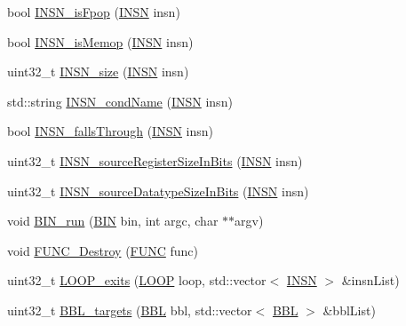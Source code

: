 \begin{DoxyCompactItemize}
\item 
bool \hyperlink{namespace_e_p_a_x_a995404839753a8da4b2fe7d27d9b32d2}{\-I\-N\-S\-N\-\_\-is\-Fpop} (\hyperlink{namespace_e_p_a_x_a601da5f2ead9a877d566da6cfc9026eb}{\-I\-N\-S\-N} insn)
\item 
bool \hyperlink{namespace_e_p_a_x_ad79c932f05a0e9b3a54d6625072ab087}{\-I\-N\-S\-N\-\_\-is\-Memop} (\hyperlink{namespace_e_p_a_x_a601da5f2ead9a877d566da6cfc9026eb}{\-I\-N\-S\-N} insn)
\item 
uint32\-\_\-t \hyperlink{namespace_e_p_a_x_ac633c15baaafa3d0fc43e61a7701dc77}{\-I\-N\-S\-N\-\_\-size} (\hyperlink{namespace_e_p_a_x_a601da5f2ead9a877d566da6cfc9026eb}{\-I\-N\-S\-N} insn)
\item 
std\-::string \hyperlink{namespace_e_p_a_x_aea916ea62f9be2c075a9fdc65675d68e}{\-I\-N\-S\-N\-\_\-cond\-Name} (\hyperlink{namespace_e_p_a_x_a601da5f2ead9a877d566da6cfc9026eb}{\-I\-N\-S\-N} insn)
\item 
bool \hyperlink{namespace_e_p_a_x_a753a61ab7cbf2d2cf3894f87b05575d2}{\-I\-N\-S\-N\-\_\-falls\-Through} (\hyperlink{namespace_e_p_a_x_a601da5f2ead9a877d566da6cfc9026eb}{\-I\-N\-S\-N} insn)
\item 
uint32\-\_\-t \hyperlink{namespace_e_p_a_x_a14b8ff0be25a61fa32905f2114ab278e}{\-I\-N\-S\-N\-\_\-source\-Register\-Size\-In\-Bits} (\hyperlink{namespace_e_p_a_x_a601da5f2ead9a877d566da6cfc9026eb}{\-I\-N\-S\-N} insn)
\item 
uint32\-\_\-t \hyperlink{namespace_e_p_a_x_a0a072c84ca3855c0bd6abf775ccbe448}{\-I\-N\-S\-N\-\_\-source\-Datatype\-Size\-In\-Bits} (\hyperlink{namespace_e_p_a_x_a601da5f2ead9a877d566da6cfc9026eb}{\-I\-N\-S\-N} insn)
\item 
void \hyperlink{namespace_e_p_a_x_a3d3f6035b509ee30f07ab3fecdd374e8}{\-B\-I\-N\-\_\-run} (\hyperlink{namespace_e_p_a_x_ad71db9d891528e4a8b303787dff8ac0b}{\-B\-I\-N} bin, int argc, char $\ast$$\ast$argv)
\item 
void \hyperlink{namespace_e_p_a_x_a39671871fe999507b8954f9ba594b529}{\-F\-U\-N\-C\-\_\-\-Destroy} (\hyperlink{namespace_e_p_a_x_a5b05cc89d633ec2241cb3af828c03024}{\-F\-U\-N\-C} func)
\item 
uint32\-\_\-t \hyperlink{namespace_e_p_a_x_a0562acd48d56e4abcd0be7a04412039e}{\-L\-O\-O\-P\-\_\-exits} (\hyperlink{namespace_e_p_a_x_ac236645423e99e8ccc784040ff1f881e}{\-L\-O\-O\-P} loop, std\-::vector$<$ \hyperlink{namespace_e_p_a_x_a601da5f2ead9a877d566da6cfc9026eb}{\-I\-N\-S\-N} $>$ \&insn\-List)
\item 
uint32\-\_\-t \hyperlink{namespace_e_p_a_x_a578637b1f975f74d475e0e4b5fdf6527}{\-B\-B\-L\-\_\-targets} (\hyperlink{namespace_e_p_a_x_a0ad4f6573b03fa5c375bed0e68d4fab0}{\-B\-B\-L} bbl, std\-::vector$<$ \hyperlink{namespace_e_p_a_x_a0ad4f6573b03fa5c375bed0e68d4fab0}{\-B\-B\-L} $>$ \&bbl\-List)
$$
\end{DoxyCompactItemize}

